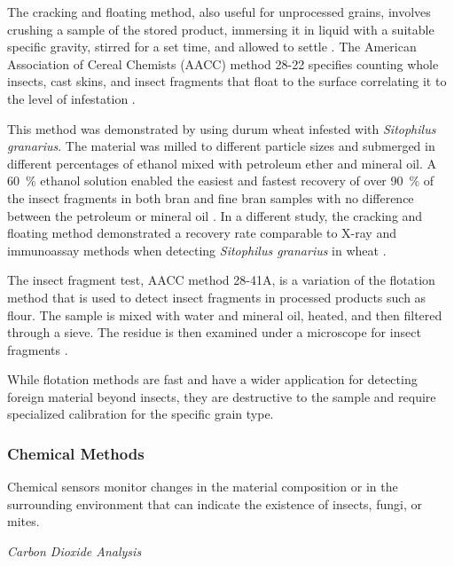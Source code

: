 \documentclass[../Vibro-Acoustic Signatures and Detection Algorithms for Stored Product Insects.tex]{subfiles}
\begin{document}
The cracking and floating method, also useful for unprocessed grains, involves crushing a sample of the stored product, immersing it in liquid with a suitable specific gravity, stirred for a set time, and allowed to settle \cite{thindFlotationTechniqueQuantitative1979,thindModifiedFlotationTechnique1984,thindDeterminationLowLevels2000}. The American Association of Cereal Chemists (AACC) method 28-22 specifies counting whole insects, cast skins, and insect fragments that float to the surface correlating it to the level of infestation \cite{braderComparisonScreeningMethods2002}.

This method was demonstrated by using durum wheat infested with \textit{Sitophilus granarius}. The material was milled to different particle sizes and submerged in different percentages of ethanol mixed with petroleum ether and mineral oil. A \SI{60}{\percent} ethanol solution enabled the easiest and fastest recovery of over \SI{90}{\percent} of the insect fragments in both bran and fine bran samples with no difference between the petroleum or mineral oil \cite{germinaraDevelopmentFlotationMethod2010}. In a different study, the cracking and floating method demonstrated a recovery rate comparable to X-ray and immunoassay methods when detecting \textit{Sitophilus granarius} in wheat \cite{braderComparisonScreeningMethods2002}.

The insect fragment test, AACC method 28-41A, is a variation of the flotation method that is used to detect insect fragments in processed products such as flour. The sample is mixed with water and mineral oil, heated, and then filtered through a sieve. The residue is then examined under a microscope for insect fragments \cite{braderComparisonScreeningMethods2002}.

While flotation methods are fast and have a wider application for detecting foreign material beyond insects, they are destructive to the sample and require specialized calibration for the specific grain type.



\newpage
\subsubsection{Chemical Methods}

Chemical sensors monitor changes in the material composition or in the surrounding environment that can indicate the existence of insects, fungi, or mites.

\textit{Carbon Dioxide Analysis}
\end{document}

